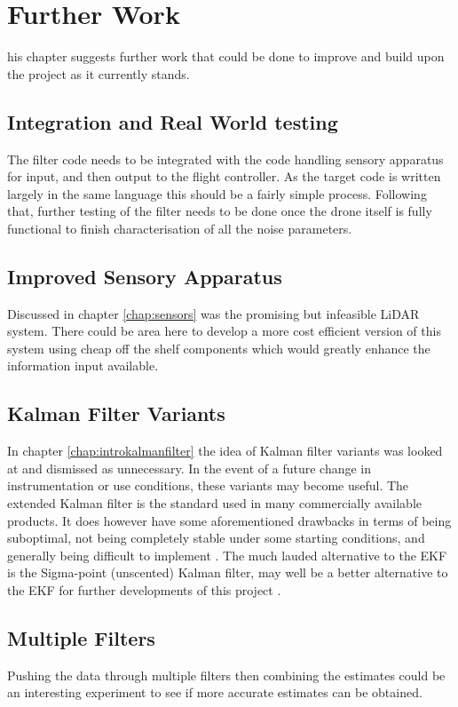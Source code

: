 \let\textcircled=\pgftextcircled
\chapter{Further Work}
\label{chap:furtherwork}

his chapter suggests further work that could be done to improve and build upon the project as it currently stands.

\section{Integration and Real World testing}
The filter code needs to be integrated with the code handling sensory apparatus for input, and then output to the flight controller. As the target code is written largely in the same language this should be a fairly simple process. Following that, further testing of the filter needs to be done once the drone itself is fully functional to finish characterisation of all the noise parameters.

\section{Improved Sensory Apparatus}
Discussed in chapter \ref{chap:sensors} was the promising but infeasible LiDAR system. There could be area here to develop a more cost efficient version of this system using cheap off the shelf components which would greatly enhance the information input available.

\section{Kalman Filter Variants}
In chapter \ref{chap:introkalmanfilter} the idea of Kalman filter variants was looked at and dismissed as unnecessary. In the event of a future change in instrumentation or use conditions, these variants may become useful. The extended Kalman filter is the standard used in many commercially available products. It does however have some aforementioned drawbacks in terms of being suboptimal, not being completely stable under some starting conditions, and generally being difficult to implement \cite{julier2004unscented}. The much lauded alternative to the EKF is the Sigma-point (unscented) Kalman filter, may well be a better alternative to the EKF for further developments of this project \cite{van2004sigma}.

\section{Multiple Filters}
Pushing the data through multiple filters then combining the estimates could be an interesting experiment to see if more accurate estimates can be obtained.


